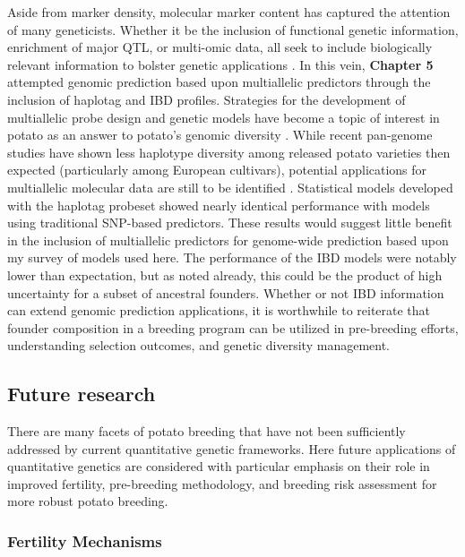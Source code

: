 \documentclass[
]{article}
\begin{document}
Aside from marker density, molecular marker content has captured the
attention of many geneticists. Whether it be the inclusion of functional
genetic information, enrichment of major QTL, or multi-omic data, all
seek to include biologically relevant information to bolster genetic
applications \autocite{Guo2016,MacLeod2016,Arouisse2024}. In this vein,
\textbf{Chapter 5} attempted genomic prediction based upon multiallelic
predictors through the inclusion of haplotag and IBD profiles.
Strategies for the development of multiallelic probe design and genetic
models have become a topic of interest in potato as an answer to
potato's genomic diversity \autocite{Tang2022}. While recent pan-genome
studies have shown less haplotype diversity among released potato
varieties then expected (particularly among European cultivars),
potential applications for multiallelic molecular data are still to be
identified \autocite{Sun2025}. Statistical models developed with the
haplotag probeset showed nearly identical performance with models using
traditional SNP-based predictors. These results would suggest little
benefit in the inclusion of multiallelic predictors for genome-wide
prediction based upon my survey of models used here. The performance of
the IBD models were notably lower than expectation, but as noted
already, this could be the product of high uncertainty for a subset of
ancestral founders. Whether or not IBD information can extend genomic
prediction applications, it is worthwhile to reiterate that founder
composition in a breeding program can be utilized in pre-breeding
efforts, understanding selection outcomes, and genetic diversity
management.

\subsection{Future research}\label{sec-future}

There are many facets of potato breeding that have not been sufficiently
addressed by current quantitative genetic frameworks. Here future
applications of quantitative genetics are considered with particular
emphasis on their role in improved fertility, pre-breeding methodology,
and breeding risk assessment for more robust potato breeding.

\subsubsection{Fertility Mechanisms}\label{fertility-mechanisms}
\end{document}
